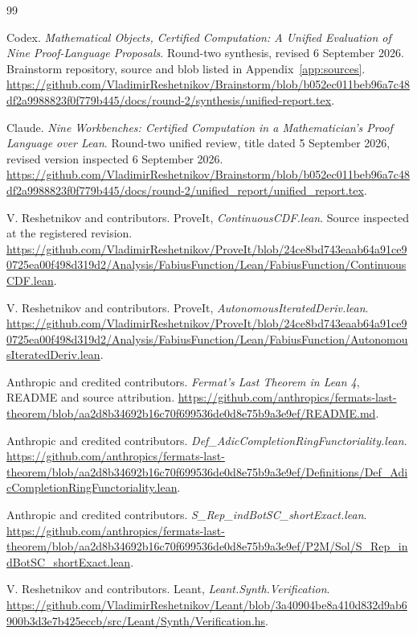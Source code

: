 \documentclass[11pt,a4paper]{article}
\theoremstyle{plain}
\theoremstyle{definition}
\theoremstyle{remark}
\begin{document}
\clearpage
\begin{thebibliography}{99}
\small\raggedright
\setlength{\parskip}{0pt}
\setlength{\itemsep}{2pt}
 Codex. \emph{Mathematical Objects, Certified Computation:
A Unified Evaluation of Nine Proof-Language Proposals}. Round-two synthesis,
revised 6 September 2026. Brainstorm repository, source and blob listed in
Appendix~\ref{app:sources}.
\url{https://github.com/VladimirReshetnikov/Brainstorm/blob/b052ec011beb96a7c48df2a9988823f0f779b445/docs/round-2/synthesis/unified-report.tex}.

 Claude. \emph{Nine Workbenches: Certified Computation in a
Mathematician's Proof Language over Lean}. Round-two unified review, title
dated 5 September 2026, revised version inspected 6 September 2026.
\url{https://github.com/VladimirReshetnikov/Brainstorm/blob/b052ec011beb96a7c48df2a9988823f0f779b445/docs/round-2/unified_report/unified_report.tex}.

 V. Reshetnikov and contributors. ProveIt,
\emph{ContinuousCDF.lean}. Source inspected at the registered revision.
\url{https://github.com/VladimirReshetnikov/ProveIt/blob/24ce8bd743eaab64a91ce90725ea00f498d319d2/Analysis/FabiusFunction/Lean/FabiusFunction/ContinuousCDF.lean}.

 V. Reshetnikov and contributors. ProveIt,
\emph{AutonomousIteratedDeriv.lean}.
\url{https://github.com/VladimirReshetnikov/ProveIt/blob/24ce8bd743eaab64a91ce90725ea00f498d319d2/Analysis/FabiusFunction/Lean/FabiusFunction/AutonomousIteratedDeriv.lean}.

 Anthropic and credited contributors. \emph{Fermat's Last
Theorem in Lean 4}, README and source attribution.
\url{https://github.com/anthropics/fermats-last-theorem/blob/aa2d8b34692b16c70f699536de0d8e75b9a3e9ef/README.md}.

 Anthropic and credited contributors.
\emph{Def\_AdicCompletionRingFunctoriality.lean}.
\url{https://github.com/anthropics/fermats-last-theorem/blob/aa2d8b34692b16c70f699536de0d8e75b9a3e9ef/Definitions/Def_AdicCompletionRingFunctoriality.lean}.

 Anthropic and credited contributors.
\emph{S\_Rep\_indBotSC\_shortExact.lean}.
\url{https://github.com/anthropics/fermats-last-theorem/blob/aa2d8b34692b16c70f699536de0d8e75b9a3e9ef/P2M/Sol/S_Rep_indBotSC_shortExact.lean}.

 V. Reshetnikov and contributors. Leant,
\emph{Leant.Synth.Verification}.
\url{https://github.com/VladimirReshetnikov/Leant/blob/3a40904be8a410d832d9ab6900b3d3e7b425eccb/src/Leant/Synth/Verification.hs}.


\end{thebibliography}
\end{document}
